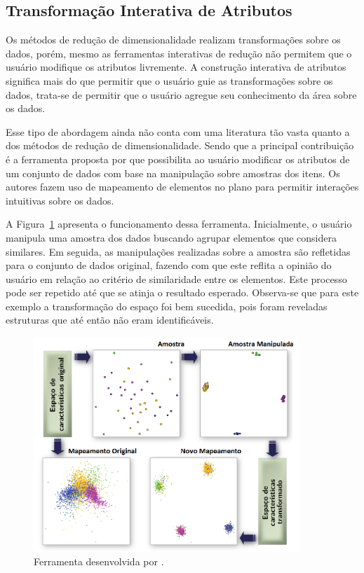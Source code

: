 \subsection{Transformação Interativa de
Atributos}\label{sec:tr}

Os métodos de redução de dimensionalidade realizam
transformações sobre os dados, porém, mesmo as ferramentas
interativas de redução não permitem que o usuário modifique
os atributos livremente. A construção interativa de
atributos significa mais do que permitir que o usuário guie
as transformações sobre os dados, trata-se de permitir que o
usuário agregue seu conhecimento da área sobre os dados. 

Esse tipo de abordagem ainda não conta com uma literatura
tão vasta quanto a dos métodos de redução de
dimensionalidade.  Sendo que a principal contribuição é a
ferramenta proposta por \citet{Gladys2013} que possibilita ao
usuário modificar os atributos de um conjunto de dados com
base na manipulação sobre amostras dos itens. Os autores
fazem uso de mapeamento de elementos no plano para permitir
interações intuitivas sobre os dados. 

A Figura~\ref{fig:ud} apresenta  o funcionamento dessa
ferramenta. Inicialmente, o usuário manipula uma amostra dos
dados buscando  agrupar elementos que considera similares.
Em seguida, as manipulações realizadas sobre a amostra são
refletidas para o conjunto de dados original, fazendo com
que este reflita a opinião do usuário em relação ao critério
de similaridade entre os elementos. Este processo pode ser
repetido até que se atinja o resultado esperado. Observa-se
que para este exemplo a transformação do espaço foi bem
sucedida, pois foram reveladas estruturas que até então não
eram identificáveis.

\begin{figure}[h!]
    \centering
    \includegraphics[width=10cm]{images/ud.png}
    \caption{Ferramenta desenvolvida por \cite{Gladys2013}.}
    \label{fig:ud}
\end{figure}

